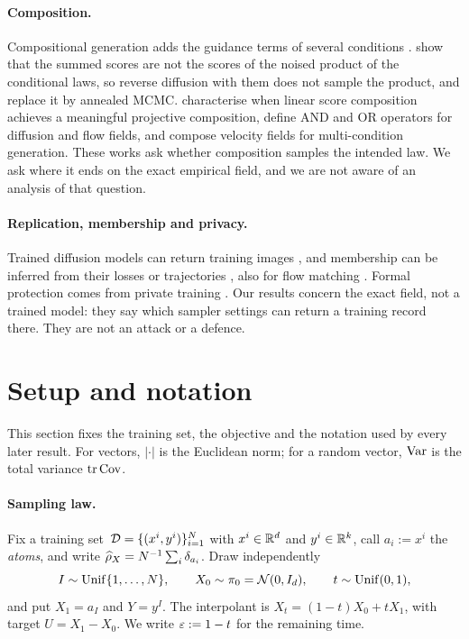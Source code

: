 \documentclass{article} %
\theoremstyle{plain}
\theoremstyle{definition}
\theoremstyle{remark}
\begin{document}
\paragraph{Composition.} Compositional generation adds the guidance terms of several conditions
\citep{liu2022composable}. \citet{du2023reduce} show that the summed scores are not the scores of
the noised product of the conditional laws, so reverse diffusion with them does not sample the
product, and replace it by annealed MCMC. \citet{bradley2025mechanisms} characterise when linear
score composition achieves a meaningful projective composition, \citet{skreta2025superposition}
define AND and OR operators for diffusion and flow fields, and \citet{miglior2026compflow} compose
velocity fields for multi-condition generation. These works ask whether composition samples the
intended law. We ask where it ends on the exact empirical field, and we are not aware of an
analysis of that question.

\paragraph{Replication, membership and privacy.} Trained diffusion models can return training
images \citep{carlini2023extracting,somepalli2023diffusion}, and membership can be inferred from
their losses or trajectories \citep{duan2023are,matsumoto2023membership}, also for flow
matching \citep{sesmat2026leaks}. Formal protection comes from private training
\citep{dockhorn2023differentially}. Our results concern the exact field, not a trained model:
they say which sampler settings can return a training record there. They are not an attack or a
defence.

\section{Setup and notation}
\label{sec:setup}

This section fixes the training set, the objective and the notation used by every later result.
For vectors, $|\cdot|$ is the Euclidean norm; for a random vector, $\operatorname{Var}$ is the total
variance $\operatorname{tr}\operatorname{Cov}$.

\paragraph{Sampling law.} Fix a training set~$\mathcal{D}=\{(x^i,y^i)\}_{i=1}^N$ with $x^i\in\mathbb{R}^d$ and
$y^i\in\mathbb{R}^k$, call $a_i:=x^i$ the \emph{atoms}, and write $\widehat{\rho}_X=N^{-1}\sum_i\delta_{a_i}$. Draw independently
\begin{equation}
I\sim\mathrm{Unif}\{1,\dots,N\},\qquad X_0\sim\pi_0=\mathcal{N}(0,I_d),\qquad t\sim\mathrm{Unif}(0,1),
\label{eq:sampling}
\end{equation}
and put $X_1=a_I$ and $Y=y^I$. The interpolant is $X_t=(1-t)X_0+tX_1$, with target $U=X_1-X_0$.
We write $\varepsilon:=1-t$ for the remaining time.
\end{document}
